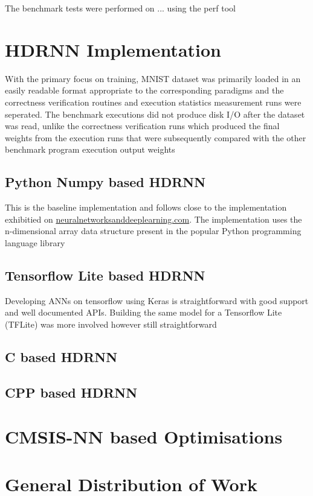 The benchmark tests were performed on ... using the perf tool

\section{HDRNN Implementation}

With the primary focus on training, MNIST dataset was primarily loaded in an easily readable format appropriate to the corresponding paradigms and the correctness verification routines and execution statistics measurement runs were seperated. The benchmark executions did not produce disk I/O after the dataset was read, unlike the correctness verification runs which produced the final weights from the execution runs that were subsequently compared with the other benchmark program execution output weights

\subsection[Python - Numpy]{Python Numpy based HDRNN}

This is the baseline implementation and follows close to the implementation exhibitied on \href{http://neuralnetworksanddeeplearning.com}{neuralnetworksanddeeplearning.com}. The implementation uses the n-dimensional array data structure present in the popular Python programming language library

\subsection[Tensorflow Lite]{Tensorflow Lite based HDRNN}

Developing ANNs on tensorflow using Keras is straightforward with good support and well documented APIs. Building the same model for a Tensorflow Lite (TFLite) was more involved however still straightforward

\subsection[C]{C based HDRNN}

\subsection[CPP - Eigen]{CPP based HDRNN}

\section{CMSIS-NN based Optimisations}
\textit{}

\section{General Distribution of Work}
